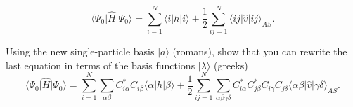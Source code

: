 \documentclass[prc]{revtex4}
\begin{document}
\[
  \langle \Psi_0 \vert \hat{H}\vert \Psi_0\rangle 
  = \sum_{i=1}^N \langle i | h | i \rangle +
  \frac{1}{2}\sum_{ij=1}^N\langle ij|\hat{v}|ij\rangle_{AS}.
\]

Using the new single-particle basis $\vert a\rangle$ (romans), show that you can rewrite the last equation in terms of the
basis functions $\vert \lambda\rangle$ (greeks)
\begin{equation}
  \langle \Psi_0 \vert \hat{H}\vert \Psi_0\rangle 
  = \sum_{i=1}^N \sum_{\alpha\beta} C^*_{i\alpha}C_{i\beta}\langle \alpha | h | \beta \rangle +
  \frac{1}{2}\sum_{ij=1}^N\sum_{{\alpha\beta\gamma\delta}} C^*_{i\alpha}C^*_{j\beta}C_{i\gamma}C_{j\delta}\langle \alpha\beta|\hat{v}|\gamma\delta\rangle_{AS}. 
\end{equation}
\end{document}

